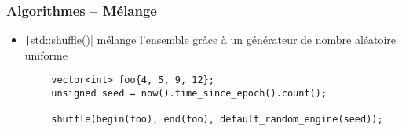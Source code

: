 \documentclass[C++.tex]{subfiles}
\begin{document}
\begin{frame}[fragile]
	\frametitle{Algorithmes -- Mélange}
	\begin{itemize}
		\item \texttt|std::shuffle()| mélange l'ensemble grâce à un générateur de nombre aléatoire uniforme
	\end{itemize}

	\begin{verbatim}
		vector<int> foo{4, 5, 9, 12};
		unsigned seed = now().time_since_epoch().count();

		shuffle(begin(foo), end(foo), default_random_engine(seed));
	\end{verbatim}


\end{frame}
\end{document}
